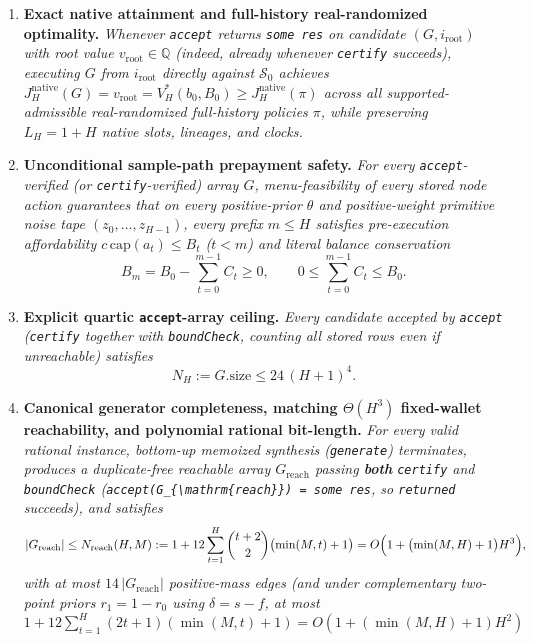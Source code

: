 \documentclass[11pt,letterpaper]{article}
\providecommand{\tightlist}{\setlength{\itemsep}{2pt}\setlength{\parskip}{0pt}}
\begin{document}
\begin{enumerate}
\def\labelenumi{\arabic{enumi}.}
\tightlist
\item
  \textbf{Exact native attainment and full-history real-randomized
  optimality.} \emph{Whenever \texttt{accept} returns \texttt{some\ res}
  on candidate \((G, i_{\mathrm{root}})\) with root value
  \(v_{\mathrm{root}} \in \mathbb{Q}\) (indeed, already whenever
  \texttt{certify} succeeds), executing \(G\) from \(i_{\mathrm{root}}\)
  directly against \(\mathcal{S}_0\) achieves
  \(J_H^{\mathrm{native}}(G) = v_{\mathrm{root}} = V_H^*(b_0, B_0) \ge J_H^{\mathrm{native}}(\pi)\)
  across all supported-admissible real-randomized full-history policies
  \(\pi\), while preserving \(L_H = 1 + H\) native slots, lineages, and
  clocks.}
\item
  \textbf{Unconditional sample-path prepayment safety.} \emph{For every
  \texttt{accept}-verified (or \texttt{certify}-verified) array \(G\),
  menu-feasibility of every stored node action guarantees that on every
  positive-prior \(\theta\) and positive-weight primitive noise tape
  \((z_0, \dots, z_{H-1})\), every prefix \(m \le H\) satisfies
  pre-execution affordability \(c\,\mathrm{cap}(a_t) \le B_t\)
  (\(t < m\)) and literal balance conservation}
  \[B_m = B_0 - \sum_{t=0}^{m-1} C_t \ge 0, \qquad 0 \le \sum_{t=0}^{m-1} C_t \le B_0.\]
\item
  \textbf{Explicit quartic \texttt{accept}-array ceiling.} \emph{Every
  candidate accepted by \texttt{accept} (\texttt{certify} together with
  \texttt{boundCheck}, counting all stored rows even if unreachable)
  satisfies} \[N_H := G.\mathrm{size} \le 24\,(H + 1)^4.\]
\item
  \textbf{Canonical generator completeness, matching \(\Theta(H^3)\)
  fixed-wallet reachability, and polynomial rational bit-length.}
  \emph{For every valid rational instance, bottom-up memoized synthesis
  (\texttt{generate}) terminates, produces a duplicate-free reachable
  array \(G_{\mathrm{reach}}\) passing \textbf{both} \texttt{certify}
  and \texttt{boundCheck}
  (\texttt{accept(G\_\{\textbackslash{}mathrm\{reach\}\})\ =\ some\ res},
  so \texttt{returned} succeeds), and satisfies}
  \[|G_{\mathrm{reach}}| \le N_{\mathrm{reach}}(H, M) := 1 + 12 \sum_{t=1}^{H} \binom{t+2}{2}\bigl(\min(M, t) + 1\bigr) = O\Bigl(1 + \bigl(\min(M, H) + 1\bigr)H^3\Bigr),\]
  \emph{with at most \(14\,|G_{\mathrm{reach}}|\) positive-mass edges
  (and under complementary two-point priors \(r_1 = 1 - r_0\) using
  \(\delta = s - f\), at most
  \(1 + 12\sum_{t=1}^H (2t + 1)(\min(M, t) + 1) = O(1 + (\min(M, H) + 1)H^2)\)
}
\end{enumerate}
\end{document}
